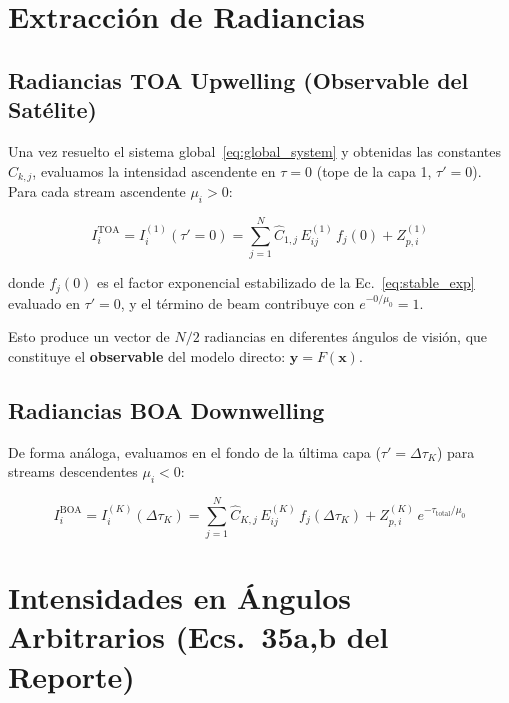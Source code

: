 \documentclass[a4paper,11pt]{article}
\begin{document}
\section{Extracci\'on de Radiancias}

\subsection{Radiancias TOA Upwelling (Observable del Sat\'elite)}

Una vez resuelto el sistema global~\eqref{eq:global_system} y obtenidas las
constantes $\hat{C}_{k,j}$, evaluamos la intensidad ascendente en $\tau=0$
(tope de la capa 1, $\tau'=0$).  Para cada stream ascendente $\mu_i > 0$:

\begin{equation}\label{eq:I_toa}
    \boxed{I_i^{\text{TOA}} = I_i^{(1)}(\tau'=0)
    = \sum_{j=1}^{N}\hat{C}_{1,j}\,E^{(1)}_{ij}\,f_j(0)
    + Z_{p,i}^{(1)}}
\end{equation}

donde $f_j(0)$ es el factor exponencial estabilizado de la
Ec.~\eqref{eq:stable_exp} evaluado en $\tau'=0$, y el t\'ermino de beam
contribuye con $e^{-0/\mu_0} = 1$.

Esto produce un vector de $N/2$ radiancias en diferentes \'angulos de visi\'on,
que constituye el \textbf{observable} del modelo directo: $\mathbf{y} = F(\mathbf{x})$.

\subsection{Radiancias BOA Downwelling}

De forma an\'aloga, evaluamos en el fondo de la \'ultima capa
($\tau'=\Delta\tau_K$) para streams descendentes $\mu_i < 0$:

\begin{equation}
    I_i^{\text{BOA}} = I_i^{(K)}(\Delta\tau_K)
    = \sum_{j=1}^{N}\hat{C}_{K,j}\,E^{(K)}_{ij}\,f_j(\Delta\tau_K)
    + Z_{p,i}^{(K)}\,e^{-\tau_{\text{total}}/\mu_0}
\end{equation}


\section{Intensidades en \'Angulos Arbitrarios (Ecs.~35a,b del Reporte)}
\label{sec:interpolation}
\end{document}
